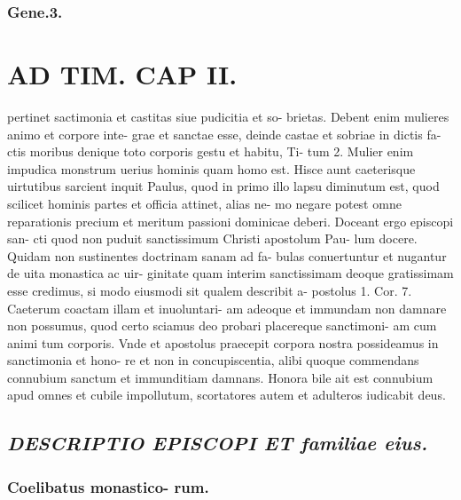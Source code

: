\documentclass{article}
\begin{document}
\begin{pages}
\subsubsection*{Gene.3. }
\section*{AD TIM. CAP II. }
\marginpar{[ p.122 ]}\pstart pertinet sactimonia et castitas siue pudicitia et so- brietas. Debent enim mulieres animo et corpore inte- grae et sanctae esse, deinde castae et sobriae in dictis fa- ctis moribus denique toto corporis gestu et habitu, Ti- tum 2. Mulier enim impudica monstrum uerius hominis quam homo est. Hisce aunt caeterisque uirtutibus sarcient inquit Paulus, quod in primo illo lapsu diminutum est, quod scilicet hominis partes et officia attinet, alias ne- mo negare potest omne reparationis precium et meritum passioni dominicae deberi. Doceant ergo episcopi san- cti quod non puduit sanctissimum Christi apostolum Pau- lum docere. Quidam non sustinentes doctrinam sanam ad fa- bulas conuertuntur et nugantur de uita monastica ac uir- ginitate quam interim sanctissimam deoque gratissimam esse credimus, si modo eiusmodi sit qualem describit a- postolus 1. Cor. 7. Caeterum coactam illam et inuoluntari- am adeoque et immundam non damnare non possumus, quod certo sciamus deo probari placereque sanctimoni- am cum animi tum corporis. Vnde et apostolus praecepit corpora nostra possideamus in sanctimonia et hono- re et non in concupiscentia, alibi quoque commendans connubium sanctum et immunditiam damnans. Honora bile ait est connubium apud omnes et cubile impollutum, scortatores autem et adulteros iudicabit deus.  \pend 
{}
{}
\subsection*{\textit{DESCRIPTIO EPISCOPI ET familiae eius. }}
\subsubsection*{Coelibatus monastico- rum. }

\end{pages}
\end{document}
